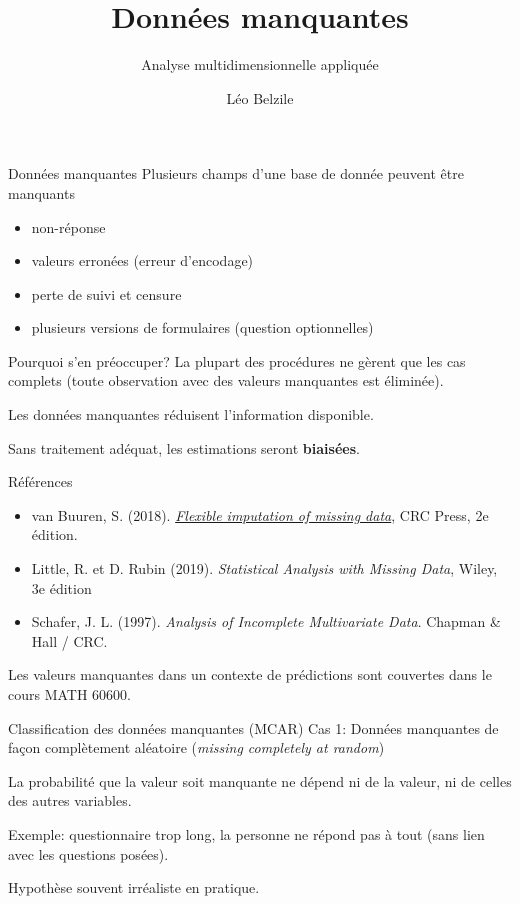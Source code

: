 \documentclass[
  ignorenonframetext,
]{beamer}
\title{Données manquantes}
\subtitle{Analyse multidimensionnelle appliquée}
\author{Léo Belzile}
\date{}
\institute{HEC Montréal}
\providecommand{\tightlist}{%
  \setlength{\itemsep}{0pt}\setlength{\parskip}{0pt}}\usepackage{longtable,booktabs,array}
\begin{document}
\frame{\titlepage}
\ifdefined\Shaded\renewenvironment{Shaded}{\begin{tcolorbox}[enhanced, boxrule=0pt, borderline west={3pt}{0pt}{shadecolor}, breakable, interior hidden, frame hidden, sharp corners]}{\end{tcolorbox}}\fi

\begin{frame}{Données manquantes}
\protect\hypertarget{donnuxe9es-manquantes}{}
Plusieurs champs d'une base de donnée peuvent être manquants

\begin{itemize}
\tightlist
\item
  non-réponse
\item
  valeurs erronées (erreur d'encodage)
\item
  perte de suivi et censure
\item
  plusieurs versions de formulaires (question optionnelles)
\end{itemize}
\end{frame}

\begin{frame}{Pourquoi s'en préoccuper?}
\protect\hypertarget{pourquoi-sen-pruxe9occuper}{}
La plupart des procédures ne gèrent que les cas complets (toute
observation avec des valeurs manquantes est éliminée).

Les données manquantes réduisent l'information disponible.

Sans traitement adéquat, les estimations seront \textbf{biaisées}.
\end{frame}

\begin{frame}{Références}
\protect\hypertarget{ruxe9fuxe9rences}{}
\begin{itemize}
\tightlist
\item
  van Buuren, S. (2018).
  \href{https://stefvanbuuren.name/fimd/}{\emph{Flexible imputation of
  missing data}}, CRC Press, 2e édition.
\item
  Little, R. et D. Rubin (2019). \emph{Statistical Analysis with Missing
  Data}, Wiley, 3e édition
\item
  Schafer, J. L. (1997). \emph{Analysis of Incomplete Multivariate
  Data}. Chapman \& Hall / CRC.
\end{itemize}

Les valeurs manquantes dans un contexte de prédictions sont couvertes
dans le cours MATH 60600.
\end{frame}

\begin{frame}{Classification des données manquantes (MCAR)}
\protect\hypertarget{classification-des-donnuxe9es-manquantes-mcar}{}
Cas 1: Données manquantes de façon complètement aléatoire (\emph{missing
completely at random})

La probabilité que la valeur soit manquante ne dépend ni de la valeur,
ni de celles des autres variables.

Exemple: questionnaire trop long, la personne ne répond pas à tout (sans
lien avec les questions posées).

Hypothèse souvent irréaliste en pratique.
\end{frame}
\end{document}
